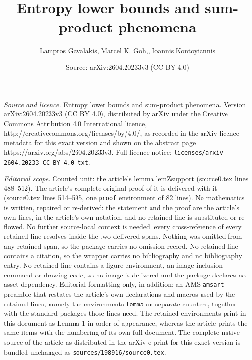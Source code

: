 \documentclass[10pt,a4paper]{amsart}
\title{Entropy lower bounds and sum-product phenomena}
\author{Lampros Gavalakis, Marcel K. Goh,, Ioannis Kontoyiannis}
\date{Source: arXiv:2604.20233v3 (CC BY 4.0)}
\begin{document}
\maketitle

\noindent\emph{Source and licence.} Entropy lower bounds and sum-product phenomena. Version arXiv:2604.20233v3 (CC BY 4.0), distributed by arXiv under the Creative Commons Attribution 4.0 International licence, http://creativecommons.org/licenses/by/4.0/, as recorded in the arXiv licence metadata for this exact version and shown on the abstract page https://arxiv.org/abs/2604.20233v3. Full licence notice: \texttt{licenses/arxiv-2604.20233-CC-BY-4.0.txt}.\par\smallskip

\noindent\textit{Editorial scope.} Counted unit: the article's lemma lemZsupport (source0.tex lines 488--512). The article's complete original proof of it is delivered with it (source0.tex lines 514--595, one \texttt{proof} environment of 82 lines). No mathematics is written, repaired or re-derived: the statement and the proof are the article's own lines, in the article's own notation, and no retained line is substituted or re-flowed.  No further source-local context is needed: every cross-reference of every retained line resolves inside the two delivered spans.  Nothing was omitted from any retained span, so the package carries no omission record.  No retained line contains a citation, so the wrapper carries no bibliography and no bibliography entry.  No retained line contains a figure environment, an image-inclusion command or drawing code, so no image is delivered and the package declares no asset dependency.  Editorial formatting only, in addition: an AMS \texttt{amsart} preamble that restates the article's own declarations and macros used by the retained lines, namely the environments \texttt{lemma} on separate counters, together with the standard packages those lines need.  The retained environments print in this document as Lemma 1 in order of appearance, whereas the article prints the same items with the numbering of its own full document.  The complete native source of the article as distributed in the arXiv e-print for this exact version is bundled unchanged as \texttt{sources/198916/source0.tex}.
\end{document}
